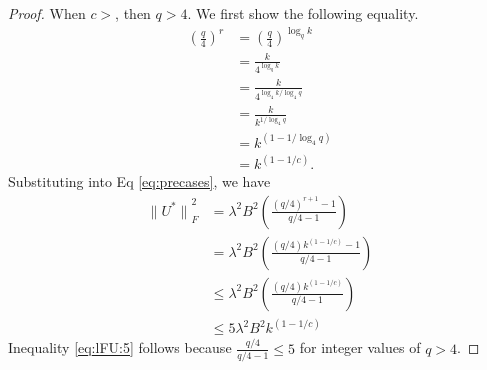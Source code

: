 \documentclass[twoside]{article}
\newtheorem{lemma}{Lemma}
\renewcommand{\star}[1]{{#1}^{*}}
\newcommand{\lF}[1]{{\lVert {#1} \rVert}_F}
\begin{document}
\begin{proof}
When $c>$, then $q>4$.
We first show the following equality.
\begin{align}
\left(\frac q 4\right)^r
&=
\left(\frac q 4\right)^{\log_q k}\\
&=
\frac{k}{4^{\log_q k}}\\
&=
\frac{k}{4^{{\log_4 k}/{\log_4 q}}}\\
&=
\frac{k}{k^{1/\log_4 q}}\\
&=
k^{\left(1 - {1}/{\log_4 q}\right)} \\
&=
k^{\left(1 - 1/c\right)}
.
\label{eq:lFU:frac}
\end{align}
Substituting into Eq \eqref{eq:precases}, we have
\begin{align}
    \lF{\star U}^2
    &= \lambda^2B^2 \left(\frac{(q/4)^{r+1}-1}{q/4-1}\right) \\
    \label{eq:lFU:4}
    &= \lambda^2B^2 \left(\frac{(q/4)k^{(1-1/c)}-1}{q/4-1}\right) \\
    &\le \lambda^2B^2 \left(\frac{(q/4)k^{(1-1/c)}}{q/4-1}\right) \\
    &\le 5 \lambda^2B^2 k^{(1-1/c)}
    \label{eq:lFU:5}
\end{align}
    Inequality \eqref{eq:lFU:5} follows because $\tfrac{q/4}{q/4-1} \le 5$ for integer values of $q>4$.
\end{proof}


\end{document}
